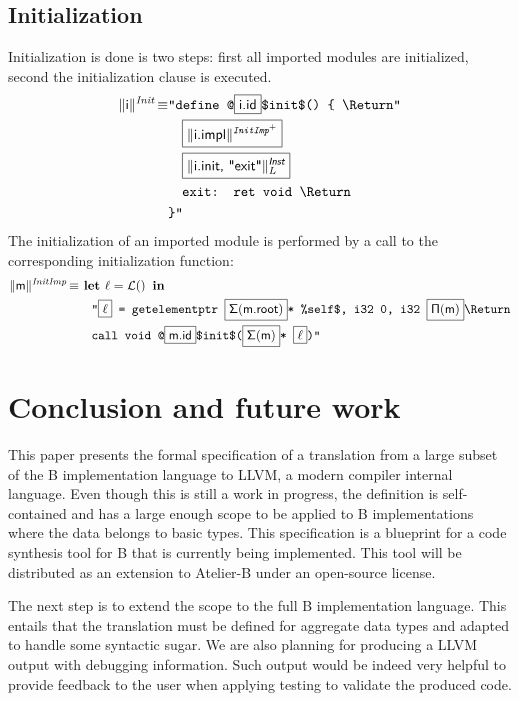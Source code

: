 \documentclass{llncs}
\newcommand{\trad}[2]{\ensuremath{\lVert \textsf{#1} \rVert^{\textit{#2}}}}
\newcommand{\nl}[0]{\text{\Return}}
\DeclareMathOperator{\isdef}{\equiv}
\DeclareMathOperator{\name}{\mathcal{L}()}
\newcommand{\llvm}[1]{\texttt{#1}}
\newcommand{\B}[1]{\textsf{#1}}
\newcommand{\ListOf}[1]{$\mbox{#1}^+$}
\newcommand{\LET}[0]{\textbf{ let }}
\newcommand{\IN}[0]{\textbf{ in }}
\newcommand{\PH}[1]{\framebox{$#1$}}
\newcommand{\idx}[0]{\ensuremath{\sf\Pi}}
\newcommand{\state}[0]{\ensuremath{\sf\Sigma}}
\begin{document}
\subsection{Initialization}
\label{sec:trad-init}

Initialization is done is two steps: first all imported modules are initialized,
second the initialization clause is executed.
\begin{align*}
  \trad{i}{Init} \isdef
  & \llvm{"define @\PH{\B{i.id}}\$init\$() \{ \nl"} \\
  & \quad\llvm{\PH{\trad{i.impl}{\ListOf{InitImp}}}} \\
  & \quad\llvm{\PH{\trad{i.init, "exit"}{\B{Inst}}_L}} \\
  & \quad\llvm{exit: ret void \nl} \\
  & \llvm{\}"}
\end{align*}
The initialization of an imported module is performed by a call to the
corresponding initialization function:
\begin{align*}
  \trad{m}{InitImp} \isdef
  & \LET \ell = \name \IN \\
  & \quad \llvm{"\PH{\ell} = getelementptr \PH{\state(\B{m.root})}* \%self\$, i32 0, i32 \PH{\idx(\B{m})}\nl}\\
  & \quad \llvm{call void @\PH{\B{m.id}}\$init\$(\PH{\state(\B{m})}* \PH{\ell})"}
\end{align*}

\section{Conclusion and future work}
\label{sec:conclusion}

This paper presents the formal specification of a translation from a large
subset of the B implementation language to LLVM, a modern compiler internal
language.  Even though this is still a work in progress, the definition is
self-contained and has a large enough scope to be applied to B implementations
where the data belongs to basic types. This specification is a blueprint for a
code synthesis tool for B that is currently being implemented. This tool will be
distributed as an extension to Atelier-B under an open-source license.

The next step is to extend the scope to the full B implementation language. This
entails that the translation must be defined for aggregate data types and
adapted to handle some syntactic sugar. We are also planning for producing a
LLVM output with debugging information. Such output would be indeed very helpful
to provide feedback to the user when applying testing to validate the produced
code.
\end{document}
